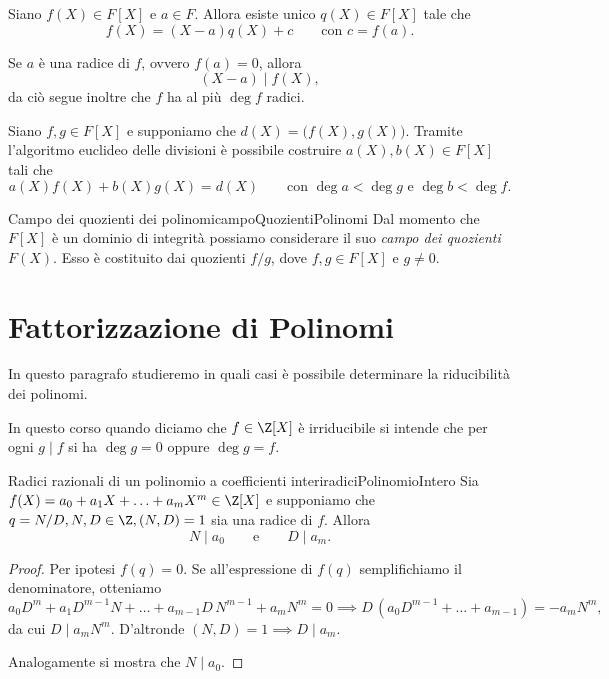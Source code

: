 \begin{pr}
	Siano \(f(X)\in F[X]\) e \(a\in F\). Allora esiste unico \(q(X)\in F[X]\) tale che
	\[
		f(X) = (X-a)q(X) + c \qquad\text{con }c=f(a).
	\]
\end{pr}

\begin{oss}
	Se \(a\) è una radice di \(f\), ovvero \(f(a)=0\), allora
	\[
		(X-a) \mid f(X),
	\]
	da ciò segue inoltre che \(f\) ha al più \(\deg f\) radici.
\end{oss}

\begin{pr}
	Siano \(f,g\in F[X]\) e supponiamo che \(d(X)=\big(f(X),g(X)\big)\).
	Tramite l'algoritmo euclideo delle divisioni è possibile costruire \(a(X),b(X)\in F[X]\) tali che
	\[
		a(X)f(X) + b(X)g(X) = d(X) \qquad\text{con }\deg a < \deg g \text{ e } \deg b < \deg f.
	\]
\end{pr}

\begin{defn}{Campo dei quozienti dei polinomi}{campoQuozientiPolinomi}
	Dal momento che \(F[X]\) è un dominio di integrità possiamo considerare il suo \emph{campo dei quozienti} \(F(X)\).
	Esso è costituito dai quozienti \(f/g\), dove \(f,g\in F[X]\) e \(g\neq 0\).
\end{defn}
\section{Fattorizzazione di Polinomi}

In questo paragrafo studieremo in quali casi è possibile determinare la riducibilità dei polinomi.

In questo corso quando diciamo che \(f\in \Z[X]\) è irriducibile si intende che per ogni \(g\mid f\) si ha \(\deg g=0\) oppure \(\deg g = f\).

\begin{prop}{Radici razionali di un polinomio a coefficienti interi}{radiciPolinomioIntero}
	Sia \(f(X) = a_0+a_1 X + \ldots + a_m X^m \in \Z[X]\) e supponiamo che \(q=N/D, N,D\in \Z, (N,D)=1\) sia una radice di \(f\).
	Allora
	\[
		N \mid a_0 \qquad\text{e}\qquad D\mid a_m.
	\]
\end{prop}

\begin{proof}
	Per ipotesi \(f(q)=0\). Se all'espressione di \(f(q)\) semplifichiamo il denominatore, otteniamo
	\[
		a_0 D^m + a_1 D^{m-1}N + \ldots + a_{m-1}D\,N^{m-1}+a_m N^m = 0 \implies D\,(a_0 D^{m-1}+\ldots+a_{m-1}) = -a_m N^m,
	\]
	da cui \(D\mid a_m N^m\). D'altronde \((N,D)=1 \implies D\mid a_m\).

	Analogamente si mostra che \(N\mid a_0\).
\end{proof}

